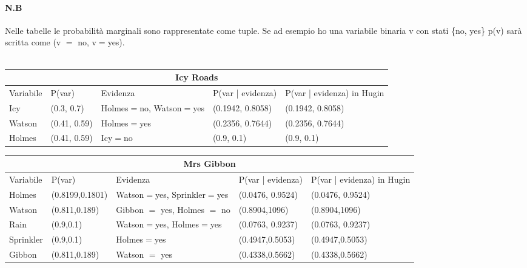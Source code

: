 \documentclass{report}
\begin{document}
\paragraph{N.B} 
Nelle tabelle le  probabilità marginali sono rappresentate come tuple. Se ad esempio ho una variabile binaria v con stati \{no, yes\} p(v) sarà scritta come (v $=$ no, v$=$yes).\\\\
\begin{table}[tbh!]
\small
\begin{tabular}{ |p{2cm}||p{2cm}|p{2cm}|p{3cm}|p{3cm}|  }
\hline
 \multicolumn{5}{|c|}{Icy Roads} \\
 \hline
 Variabile & P(var) & Evidenza & P(var | evidenza) & P(var | evidenza)  in Hugin\\
 \hline
 Icy & (0.3, 0.7) & Holmes$=$no, Watson$=$yes & (0.1942, 0.8058) & (0.1942, 0.8058)\\
\hline
 Watson & (0.41, 0.59) & Holmes$=$yes & (0.2356, 0.7644) & (0.2356, 0.7644)\\
\hline
 Holmes & (0.41, 0.59) & Icy$=$no & (0.9, 0.1) & (0.9, 0.1)\\
\hline
\end{tabular}
\newline
\vspace*{0.5 cm}
\newline

\begin{tabular}{ |p{2cm}||p{2cm}|p{2cm}|p{3cm}|p{3cm}|  }
\hline
 \multicolumn{5}{|c|}{Mrs Gibbon} \\
 \hline
Variabile & P(var) & Evidenza & P(var | evidenza) & P(var | evidenza)  in Hugin\\
 \hline
Holmes &(0.8199,0.1801) & Watson$=$yes, Sprinkler$=$yes & (0.0476, 0.9524) &(0.0476, 0.9524)\\
\hline
Watson & (0.811,0.189) & Gibbon $=$ yes, Holmes $=$ no & (0.8904,1096)& (0.8904,1096)\\
\hline
Rain & (0.9,0.1) & Watson$=$yes, Holmes$=$yes & (0.0763, 0.9237) & (0.0763, 0.9237)\\
\hline
Sprinkler & (0.9,0.1) & Holmes$=$yes & (0.4947,0.5053) & (0.4947,0.5053)\\
\hline
Gibbon & (0.811,0.189) & Watson $=$ yes & (0.4338,0.5662) & (0.4338,0.5662)\\
\hline
\end{tabular}
\end{table}
\newpage
\end{document}
